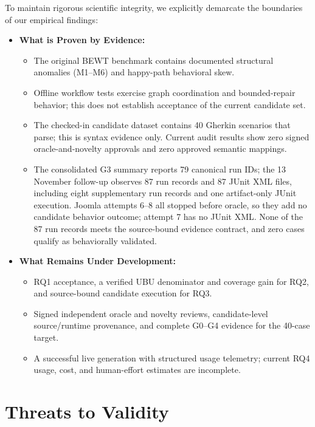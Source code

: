 \documentclass[pdflatex,sn-mathphys-num]{sn-jnl}
\begin{document}
To maintain rigorous scientific integrity, we explicitly demarcate the boundaries of our empirical findings:
\begin{itemize}
    \item \textbf{What is Proven by Evidence:}
    \begin{itemize}
        \item The original BEWT benchmark contains documented structural anomalies (M1--M6) and happy-path behavioral skew.
        \item Offline workflow tests exercise graph coordination and bounded-repair behavior; this does not establish acceptance of the current candidate set.
        \item The checked-in candidate dataset contains 40 Gherkin scenarios that parse; this is syntax evidence only. Current audit results show zero signed oracle-and-novelty approvals and zero approved semantic mappings.
        \item The consolidated G3 summary reports 79 canonical run IDs; the 13 November follow-up observes 87 run records and 87 JUnit XML files, including eight supplementary run records and one artifact-only JUnit execution. Joomla attempts 6–8 all stopped before oracle, so they add no candidate behavior outcome; attempt 7 has no JUnit XML. None of the 87 run records meets the source-bound evidence contract, and zero cases qualify as behaviorally validated.
    \end{itemize}
    \item \textbf{What Remains Under Development:}
    \begin{itemize}
        \item RQ1 acceptance, a verified UBU denominator and coverage gain for RQ2, and source-bound candidate execution for RQ3.
        \item Signed independent oracle and novelty reviews, candidate-level source/runtime provenance, and complete G0--G4 evidence for the 40-case target.
        \item A successful live generation with structured usage telemetry; current RQ4 usage, cost, and human-effort estimates are incomplete.
    \end{itemize}
\end{itemize}


\section{Threats to Validity}\label{sec:threats}
\end{document}
